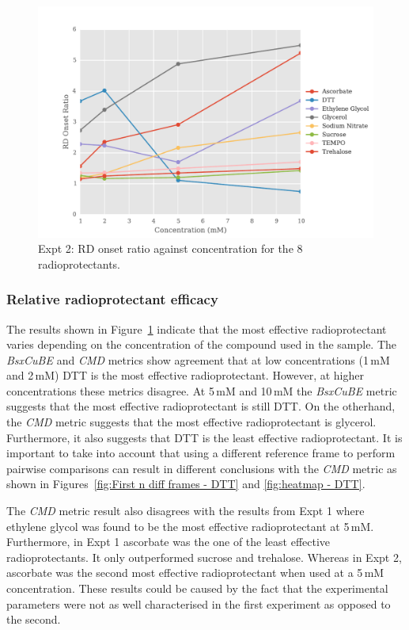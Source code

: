 \begin{figure}
    \centering
    \includegraphics[width=1.0\textwidth]{figures/saxs/RatioPlots.pdf}
    \caption[RD onset ratio against concentration for the 8 radioprotectants]{Expt 2: RD onset ratio against concentration for the 8 radioprotectants.}
    \label{fig:SAXS Ratio plot}
\end{figure}

\subsubsection{Relative radioprotectant efficacy}
\label{subs:Relative radioprotectant efficacy}
The results shown in Figure~\ref{fig:SAXS Ratio plot} indicate that the most effective radioprotectant varies depending on the concentration of the compound used in the sample.
The \textit{BsxCuBE} and \textit{CMD} metrics show agreement that at low concentrations (1$\,$mM and 2$\,$mM) DTT is the most effective radioprotectant.
However, at higher concentrations these metrics disagree.
At 5$\,$mM and 10$\,$mM the \textit{BsxCuBE} metric suggests that the most effective radioprotectant is still DTT.
On the otherhand, the \textit{CMD} metric suggests that the most effective radioprotectant is glycerol.
Furthermore, it also suggests that DTT is the least effective radioprotectant.
It is important to take into account that using a different reference frame to perform pairwise comparisons can result in different conclusions with the \textit{CMD} metric as shown in Figures~\ref{fig:First n diff frames - DTT} and \ref{fig:heatmap - DTT}.

The \textit{CMD} metric result also disagrees with the results from Expt 1 where ethylene glycol was found to be the most effective radioprotectant at 5$\,$mM.
Furthermore, in Expt 1 ascorbate was the one of the least effective radioprotectants.
It only outperformed sucrose and trehalose.
Whereas in Expt 2, ascorbate was the second most effective radioprotectant when used at a 5$\,$mM concentration.
These results could be caused by the fact that the experimental parameters were not as well characterised in the first experiment as opposed to the second.

